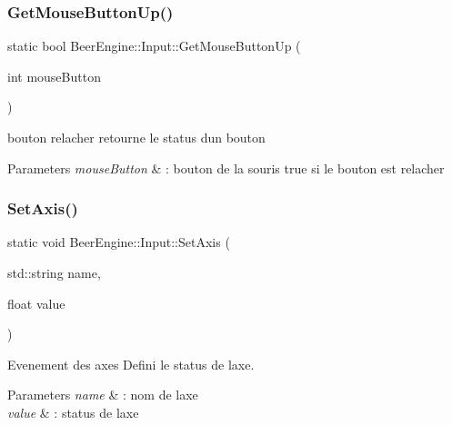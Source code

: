 \subsubsection{\texorpdfstring{Get\+Mouse\+Button\+Up()}{GetMouseButtonUp()}}
{\footnotesize\ttfamily static bool Beer\+Engine\+::\+Input\+::\+Get\+Mouse\+Button\+Up (\begin{DoxyParamCaption}\item[{int}]{mouse\+Button }\end{DoxyParamCaption})\hspace{0.3cm}{\ttfamily [static]}}



bouton relacher retourne le status d\textquotesingle{}un bouton 


\begin{DoxyParams}{Parameters}
{\em mouse\+Button} & \+: bouton de la souris  true si le bouton est relacher \\
\hline
\end{DoxyParams}
\mbox{\label{class_beer_engine_1_1_input_af7f3c17ce4e2483d03a169894e06851d}} 
\subsubsection{\texorpdfstring{Set\+Axis()}{SetAxis()}}
{\footnotesize\ttfamily static void Beer\+Engine\+::\+Input\+::\+Set\+Axis (\begin{DoxyParamCaption}\item[{std\+::string}]{name,  }\item[{float}]{value }\end{DoxyParamCaption})\hspace{0.3cm}{\ttfamily [static]}}



Evenement des axes Defini le status de l\textquotesingle{}axe. 


\begin{DoxyParams}{Parameters}
{\em name} & \+: nom de l\textquotesingle{}axe \\
\hline
{\em value} & \+: status de l\textquotesingle{}axe \\
\hline
\end{DoxyParams}
\mbox{\label{class_beer_engine_1_1_input_a8c64719adc226a57caf45ce63a0dddee}} 

